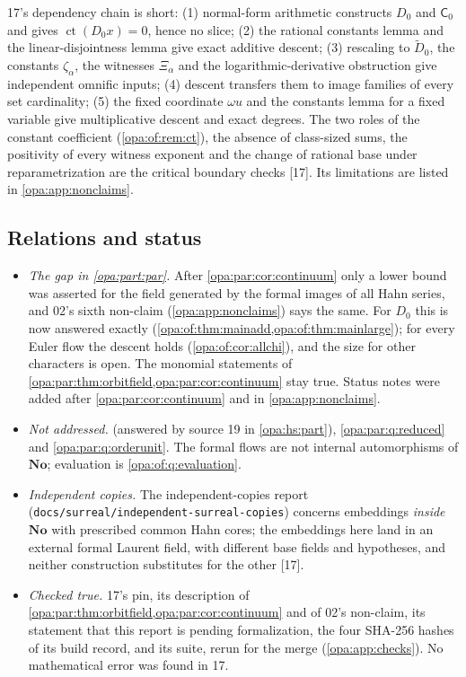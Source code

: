 \documentclass[11pt,oneside]{article}
\numberwithin{equation}{section}
\theoremstyle{definition}
\theoremstyle{remark}
\newcommand{\No}{\mathbf{No}}
\newcommand{\ct}{\operatorname{ct}}
\newcommand{\src}[1]{\textup{\textsf{\small[#1]}}}
\newcommand{\fn}[1]{\nolinkurl{#1}}
\begin{document}
17's dependency chain is short: (1) normal-form arithmetic constructs $D_0$ and $\mathsf C_0$ and gives $\ct(D_0x)=0$, hence no slice;
(2) the rational constants lemma and the linear-disjointness lemma give exact additive descent; (3) rescaling to $\widetilde D_0$,
the constants $\zeta_\alpha$, the witnesses $\Xi_\alpha$ and the logarithmic-derivative obstruction give independent omnific inputs;
(4) descent transfers them to image families of every set cardinality; (5) the fixed coordinate $\omega u$ and the constants
lemma for a fixed variable give multiplicative descent and exact degrees. The two roles of the constant coefficient
(\cref{opa:of:rem:ct}), the absence of class-sized sums, the positivity of every witness exponent and the change of rational base
under reparametrization are the critical boundary checks \src{17}. Its limitations are listed in \cref{opa:app:nonclaims}.

\subsection{Relations and status}\label{opa:of:sub:status}

\begin{itemize}[itemsep=2pt]
\item \emph{The gap in \cref{opa:part:par}.} After \cref{opa:par:cor:continuum} only a lower bound was asserted for the field generated
by the formal images of all Hahn series, and 02's sixth non-claim (\cref{opa:app:nonclaims}) says the same. For $D_0$ this is now
answered exactly (\cref{opa:of:thm:mainadd,opa:of:thm:mainlarge}); for every Euler flow the descent holds
(\cref{opa:of:cor:allchi}), and the size for other characters is open. The monomial statements of
\cref{opa:par:thm:orbitfield,opa:par:cor:continuum} stay true. Status notes were added after \cref{opa:par:cor:continuum} and in
\cref{opa:app:nonclaims}.
\item \emph{Not addressed.}  (answered by source 19 in \cref{opa:hs:part}), \cref{opa:par:q:reduced}
and \cref{opa:par:q:orderunit}. The formal flows are not internal automorphisms of $\No$; evaluation is \cref{opa:of:q:evaluation}.
\item \emph{Independent copies.} The independent-copies report (\fn{docs/surreal/independent-surreal-copies}) concerns embeddings
\emph{inside} $\No$ with prescribed common Hahn cores; the embeddings here land in an external formal Laurent field, with different
base fields and hypotheses, and neither construction substitutes for the other \src{17}.
\item \emph{Checked true.} 17's pin, its description of \cref{opa:par:thm:orbitfield,opa:par:cor:continuum} and of 02's non-claim, its
statement that this report is pending formalization, the four SHA-256 hashes of its build record, and its suite, rerun for the merge
(\cref{opa:app:checks}). No mathematical error was found in 17.
\end{itemize}
\end{document}
